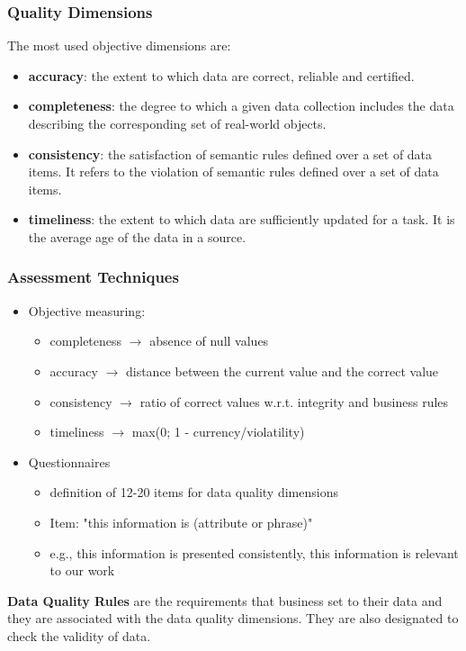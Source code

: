 \documentclass[10pt,a4paper]{article}
\begin{document}
\subsubsection{Quality Dimensions}
The most used objective dimensions are:
\begin{itemize}
	\item \textbf{accuracy}: the extent to which data are correct, reliable and certified.
	\item \textbf{completeness}: the degree to which a given data collection includes the data describing the corresponding set of real-world objects.
	\item \textbf{consistency}: the satisfaction of semantic rules defined over a set of data items. It refers to the violation of semantic rules defined over a set of data items.
	\item \textbf{timeliness}: the extent to which data are sufficiently updated for a task. It is the average age of the data in a source.
\end{itemize}
\subsubsection{Assessment Techniques}
\begin{itemize}
	\item Objective measuring: 
	\begin{itemize}
		\item completeness $\rightarrow$ absence of null values
		\item accuracy $\rightarrow$ distance between the current value and the correct value
		\item consistency $\rightarrow$ ratio of correct values w.r.t. integrity and business rules
		\item timeliness $\rightarrow$ max(0; 1 - currency/violatility)
\end{itemize}		
	\item Questionnaires
	\begin{itemize}
		\item definition of 12-20 items for data quality dimensions
		\item Item: "this information is (attribute or phrase)"
		\item e.g., this information is presented consistently, this information is relevant to our work
	\end{itemize}
\end{itemize}
\textbf{Data Quality Rules} are the requirements that business set to their data and they are associated with the data quality dimensions. They are also designated to check the validity of data.
\end{document}
